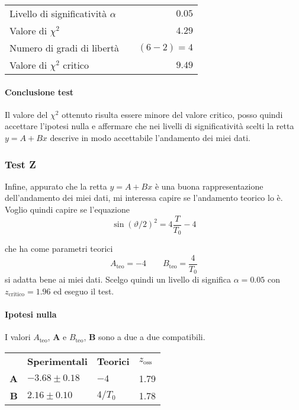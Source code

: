 \documentclass{article}
\begin{document}
\begin{table}[H]
	\centering
	\begin{tabular}{lr} 
		Livello di significatività $\alpha$		&$\quad 0.05$  \\
		Valore di $\chi ^2$             	& $\quad 4.29$       \\
		Numero di gradi di libertà      	& $\quad (6-2) = 4$         \\   
		Valore di $\chi ^2$ critico     	& $\quad 9.49$
	\end{tabular}
\end{table}

\paragraph{Conclusione test} Il valore del $\chi^2$ ottenuto risulta essere minore del valore critico, posso quindi accettare l'ipotesi nulla e affermare che nei livelli di significatività scelti la retta $y = A + Bx$ descrive in modo accettabile l'andamento dei miei dati.

\subsubsection{Test Z}
Infine, appurato che la retta $y = A + Bx$ è una buona rappresentazione dell'andamento dei miei dati, mi interessa capire se l'andamento teorico lo è. Voglio quindi capire se l'equazione 
\[
\sin{\left(\vartheta/2\right)}^2 = 4\frac{T}{T_0} - 4
\]

che ha come parametri teorici
\[
A_\text{teo} = -4 \qquad B_\text{teo} =  \frac{4}{T_0}
\]
si adatta bene ai miei dati. Scelgo quindi un livello di significa $\alpha = 0.05$ con $z_{\text{critico}} = 1.96$ ed eseguo il test.

\paragraph{Ipotesi nulla} I valori $A_{\text{teo}}$, $\mathbf{A}$ e  $B_{\text{teo}}$, $\mathbf{B}$ sono a due a due compatibili.

\begin{table}[H]
	\centering
	\begin{tabular}{@{}rp{3cm}p{2cm}p{2cm}@{}}
		
		&\textbf{Sperimentali} & \textbf{Teorici} & $z_{\text{oss}}$ \\ \cmidrule(r){2-4}
		\textbf{A}	&$-3.68 \pm 0.18 $		& $-4$	& 1.79 \\
		\textbf{B}	&$2.16 \pm  0.10$		& $4/T_0$ 		& 1.78 \\
	\end{tabular}
\end{table}
\end{document}
